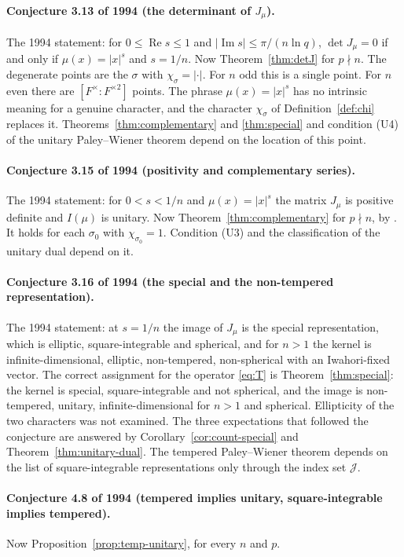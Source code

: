\documentclass[12pt,letterpaper]{article}
\numberwithin{equation}{section}
\theoremstyle{definition}
\DeclareMathOperator{\re}{Re}
\DeclareMathOperator{\im}{Im}
\begin{document}
\paragraph{Conjecture 3.13 of 1994 (the determinant of $J_\mu$).}  The 1994 statement: for
$0\le\re s\le1$ and $|\im s|\le\pi/(n\ln q)$, $\det J_\mu=0$ if and only if
$\mu(x)=|x|^s$ and $s=1/n$.  Now Theorem~\ref{thm:detJ} for $p\nmid n$.  The degenerate
points are the $\sigma$ with $\chi_\sigma=|\cdot|$.  For $n$ odd this is a single point.
For $n$ even there are $[F^\times:F^{\times2}]$ points.  The phrase $\mu(x)=|x|^s$ has no
intrinsic meaning for a genuine character, and the character $\chi_\sigma$ of
Definition~\ref{def:chi} replaces it.  Theorems~\ref{thm:complementary} and
\ref{thm:special} and condition (U4) of the unitary Paley--Wiener theorem depend on the
location of this point.

\paragraph{Conjecture 3.15 of 1994 (positivity and complementary series).}  The 1994 statement:
for $0<s<1/n$ and $\mu(x)=|x|^s$ the matrix $J_\mu$ is positive definite and $I(\mu)$ is
unitary.  Now Theorem~\ref{thm:complementary} for $p\nmid n$, by \cite{GS16,He25}.  It
holds for each $\sigma_0$ with $\chi_{\sigma_0}=1$.  Condition (U3) and the classification
of the unitary dual depend on it.

\paragraph{Conjecture 3.16 of 1994 (the special and the non-tempered representation).}  The 1994
statement: at $s=1/n$ the image of $J_\mu$ is the special representation, which is
elliptic, square-integrable and spherical, and for $n>1$ the kernel is
infinite-dimensional, elliptic, non-tempered, non-spherical with an Iwahori-fixed vector.
The correct assignment for the operator \eqref{eq:T} is Theorem~\ref{thm:special}: the
kernel is special, square-integrable and not spherical, and the image is non-tempered,
unitary, infinite-dimensional for $n>1$ and spherical.  Ellipticity of the two characters
was not examined.  The three expectations that followed the conjecture are answered by
Corollary~\ref{cor:count-special} and Theorem~\ref{thm:unitary-dual}.  The tempered
Paley--Wiener theorem depends on the list of square-integrable representations only
through the index set $\mathcal J$.

\paragraph{Conjecture 4.8 of 1994 (tempered implies unitary, square-integrable implies
tempered).}  Now Proposition~\ref{prop:temp-unitary}, for every $n$ and $p$.
\end{document}
